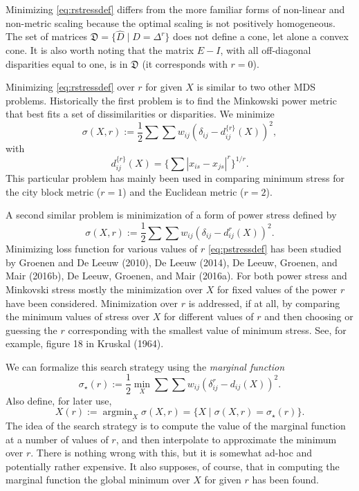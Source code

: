 \documentclass[
  12pt,
]{article}
\begin{document}
Minimizing \eqref{eq:rstressdef} differs from the more familiar forms of non-linear and non-metric scaling because the optimal scaling is not positively homogeneous. The set of matrices \(\mathfrak{D}=\{\hat D\mid\hat D=\Delta^r\}\) does not define a cone, let alone a convex cone. It is also worth noting that the matrix \(E-I\), with all off-diagonal disparities equal to one, is in \(\mathfrak{D}\) (it corresponds with \(r=0\)).

Minimizing \eqref{eq:rstressdef} over \(r\) for given \(X\) is similar to two other MDS problems. Historically the first problem is to find the Minkowski power metric that best fits a set of dissimilarities or disparities. We minimize
\begin{equation}
\sigma(X,r):=\frac12\sum\sum w_{ij}(\delta_{ij}-d_{ij}^{\{r\}}(X))^2,
\label{eq:mstressdef}
\end{equation}
with
\begin{equation}
d_{ij}^{\{r\}}(X)=\{\sum|x_{is}-x_{js}|^r\}^{1/r}.
\label{eq:minkovski}
\end{equation}
This particular problem has mainly been used in
comparing minimum stress for the city block metric (\(r=1\)) and the Euclidean metric (\(r=2\)).

A second similar problem is minimization of a form of power stress
defined by
\begin{equation}
\sigma(X,r):=\frac12\sum\sum w_{ij}(\delta_{ij}-d_{ij}^r(X))^2.
\label{eq:pstressdef}
\end{equation}
Minimizing loss function for various values of \(r\) \eqref{eq:pstressdef} has been studied by Groenen and De Leeuw (2010), De Leeuw (2014), De Leeuw, Groenen, and Mair (2016b), De Leeuw, Groenen, and Mair (2016a). For both power stress
and Minkovski stress mostly the minimization over \(X\) for fixed
values of the power \(r\) have been considered. Minimization over \(r\)
is addressed, if at all, by comparing the minimum values of stress
over \(X\) for different values of \(r\) and then choosing or guessing the
\(r\) corresponding with the smallest value of minimum stress. See, for example,
figure 18 in Kruskal (1964).

We can formalize this search strategy using the \emph{marginal function}
\begin{equation}
\sigma_\star(r):=\frac12\min_X\sum\sum w_{ij}(\delta_{ij}^r-d_{ij}(X))^2.
\label{eq:marginal}
\end{equation}
Also define, for later use,
\begin{equation}
X(r):=\mathop{\text{argmin}}_X\sigma(X, r)=\{X\mid\sigma(X,r) = \sigma_\star(r)\}.
\label{eq:argmin}
\end{equation}
The idea of the search strategy is to compute the value of the marginal function at a number of values of \(r\), and then interpolate to approximate the minimum over \(r\). There is nothing wrong with this, but it is somewhat ad-hoc and potentially rather expensive. It also supposes, of course, that
in computing the marginal function the global minimum over \(X\)
for given \(r\) has been found.
\end{document}
